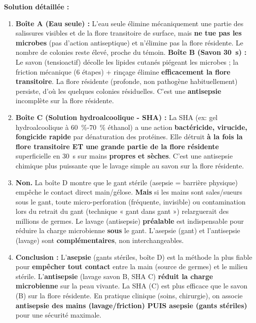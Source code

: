 \documentclass[11pt]{article}
\begin{document}
\begin{exoresolu}
\begin{enumerate}
    \end{enumerate}
    \tcblower
    \textbf{Solution détaillée :}
    \begin{enumerate}
        \item \textbf{Boîte A (Eau seule) :} L'eau seule élimine mécaniquement une partie des salissures visibles et de la flore transitoire de surface, mais \textbf{ne tue pas les microbes} (pas d'action antiseptique) et n'élimine pas la flore résidente. Le nombre de colonies reste élevé, proche du témoin. \textbf{Boîte B (Savon \SI{30}{\second}) :} Le savon (tensioactif) décolle les lipides cutanés piégeant les microbes ; la friction mécanique (6 étapes) + rinçage élimine \textbf{efficacement la flore transitoire}. La flore résidente (profonde, non pathogène habituellement) persiste, d'où les quelques colonies résiduelles. C'est une \textbf{antisepsie} incomplète sur la flore résidente.
        \item \textbf{Boîte C (Solution hydroalcoolique - SHA) :} La SHA (ex: gel hydroalcoolique à \SI{60}{\percent}-\SI{70}{\percent} éthanol) a une action \textbf{bactéricide, virucide, fongicide rapide} par dénaturation des protéines. Elle détruit \textbf{à la fois la flore transitoire ET une grande partie de la flore résidente} superficielle en \SI{30}{\second} sur mains \textbf{propres et sèches}. C'est une antisepsie chimique plus puissante que le lavage simple au savon sur la flore résidente.
        \item \textbf{Non.} La boîte D montre que le gant stérile (asepsie = barrière physique) empêche le contact direct main/gélose. \textbf{Mais} si les mains sont sales/sueurs sous le gant, toute micro-perforation (fréquente, invisible) ou contamination lors du retrait du gant (technique « gant dans gant ») relarguerait des millions de germes. Le lavage (antisepsie) \textbf{préalable} est indispensable pour réduire la charge microbienne \textbf{sous} le gant. L'asepsie (gant) et l'antisepsie (lavage) sont \textbf{complémentaires}, non interchangeables.
        \item \textbf{Conclusion :} L'\textbf{asepsie} (gants stériles, boîte D) est la méthode la plus fiable pour \textbf{empêcher tout contact} entre la main (source de germes) et le milieu stérile. L'\textbf{antisepsie} (lavage savon B, SHA C) \textbf{réduit la charge microbienne} sur la peau vivante. La SHA (C) est plus efficace que le savon (B) sur la flore résidente. En pratique clinique (soins, chirurgie), on associe \textbf{antisepsie des mains (lavage/friction) PUIS asepsie (gants stériles)} pour une sécurité maximale.
    \end{enumerate}
\end{exoresolu}
\end{document}
